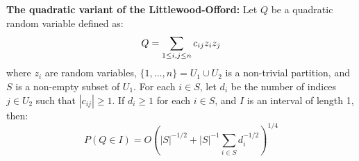 \vspace{\baselineskip}
\textbf{The quadratic variant of the Littlewood-Offord:}
Let \( Q \) be a quadratic random variable defined as:
\vspace{-0.8\baselineskip}
\[ Q = \sum_{1 \leq i,j \leq n} c_{ij} z_i z_j \vspace{-0.5\baselineskip} \]
where \( z_i \) are random variables, \( \{1,\ldots,n\} = U_1 \cup U_2 \) is a non-trivial partition, and \( S \) is a non-empty subset of \( U_1 \). For each \( i \in S \), let \( d_i \) be the number of indices \( j \in U_2 \) such that \( |c_{ij}| \geq 1 \). If \( d_i \geq 1 \) for each \( i \in S \), and \( I \) is an interval of length 1, then:
\vspace{-0.9\baselineskip}
\[ P(Q \in I) = O\left( |S|^{-1/2} + |S|^{-1} \sum_{i \in S} d_i^{-1/2} \right)^{1/4} \]



